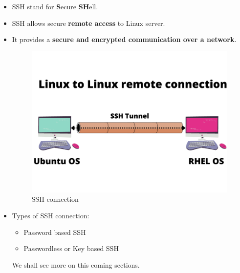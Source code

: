 \setlength{\columnsep}{3pt}
\begin{flushleft}

\bigskip

\begin{itemize}
	\item SSH stand for \textbf{S}ecure \textbf{SH}ell.
	\item SSH allows secure \textbf{remote access} to Linux server.
	\item It provides a \textbf{secure and encrypted communication over a network}.
	
	\begin{figure}[h!]
		\centering
		\includegraphics[scale=0.45]{content/chapter19/images/ssh.png}
			\caption{SSH connection}
		\label{fig:boot1}
	\end{figure}

	\item Types of SSH connection:
	\begin{itemize}
		\item Password based SSH
		\item Passwordless or Key based SSH
	\end{itemize}
	
	We shall see more on this coming sections.
	
	
\end{itemize}
 


\end{flushleft}
\newpage


